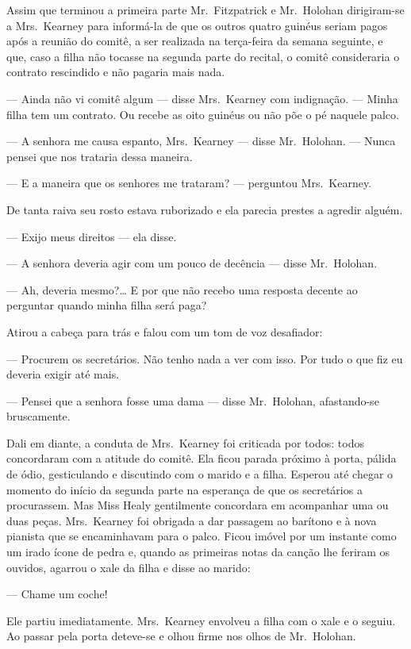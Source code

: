 Assim que terminou a primeira parte Mr.~Fitzpatrick e Mr.~Holohan dirigiram-se
a Mrs.~Kearney para informá-la de que os outros quatro guinéus seriam pagos
após a reunião do comitê, a ser realizada na terça-feira da semana seguinte, e
que, caso a filha não tocasse na segunda parte do recital, o comitê
consideraria o contrato rescindido e não pagaria mais nada.

--- Ainda não vi comitê algum --- disse Mrs.~Kearney com indignação.  --- Minha
filha tem um contrato.  Ou recebe as oito guinéus ou não põe o pé naquele
palco.

--- A senhora me causa espanto, Mrs.~Kearney --- disse Mr.~Holohan.  --- Nunca
pensei que nos trataria dessa maneira.

--- E a maneira que os senhores me trataram? --- perguntou Mrs.~Kearney.

De tanta raiva seu rosto estava ruborizado e ela parecia prestes a agredir
alguém.

--- Exijo meus direitos --- ela disse.

--- A senhora deveria agir com um pouco de decência --- disse Mr.~Holohan.

--- Ah, deveria mesmo?\ldots{}  E por que não recebo uma resposta decente ao
perguntar quando minha filha será paga?

Atirou a cabeça para trás e falou com um tom de voz desafiador:

--- Procurem os secretários.  Não tenho nada a ver com isso.  Por tudo o que
fiz eu deveria exigir até mais.

--- Pensei que a senhora fosse uma dama --- disse Mr.~Holohan, afastando-se
bruscamente.

Dali em diante, a conduta de Mrs.~Kearney foi criticada por todos: todos
concordaram com a atitude do comitê.  Ela ficou parada próximo à porta, pálida
de ódio, gesticulando e discutindo com o marido e a filha.  Esperou até chegar
o momento do início da segunda parte na esperança de que os secretários a
procurassem.  Mas Miss Healy gentilmente concordara em acompanhar uma ou duas
peças.  Mrs.~Kearney foi obrigada a dar passagem ao barítono e à nova pianista
que se encaminhavam para o palco.  Ficou imóvel por um instante como um irado
ícone de pedra e, quando as primeiras notas da canção lhe feriram os ouvidos,
agarrou o xale da filha e disse ao marido:

--- Chame um coche!

Ele partiu imediatamente.  Mrs.~Kearney envolveu a filha com o xale e o seguiu.
Ao passar pela porta deteve-se e olhou firme nos olhos de Mr.~Holohan.

